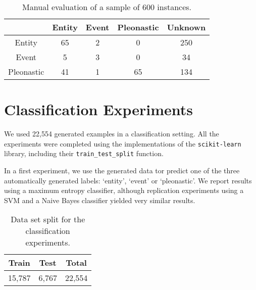 \documentclass[10pt, a4paper]{article} \usepackage{lrec} \usepackage{multibib}
\begin{document}
\begin{table}[h!]\centering 
\begin{tabular}{ccccc} 
\toprule 
&Entity & Event &Pleonastic & Unknown \\ 
\midrule Entity &   65  &  2   &   0     &  250  \\ 
Event &    5  &  3   &  0  &  34\\ 
Pleonastic& 41 & 1&  65&  134\\
\bottomrule 
\end{tabular} \caption{Manual evaluation of a sample of 600
instances.}\label{tab:manualsample600} 
\end{table}




%
%
%
%
\section{Classification Experiments}

We used 22,554 generated examples in a classification setting. All the experiments were completed using the implementations of the \texttt{scikit-learn} library, including their \texttt{train\_test\_split} function. 

In a first experiment, we use the generated data tor predict one of the three automatically generated labels: `entity', `event' or `pleonastic'. We report results using a maximum entropy classifier, although replication experiments using a SVM and a Naive Bayes classifier yielded very similar results. 


\begin{table}[h!]\centering
\begin{tabular}{ccc}
\toprule
\textbf{Train} & \textbf{Test} & \textbf{Total} \\
\midrule
15,787 & 6,767 & 22,554 \\
\bottomrule
\end{tabular}
\caption{Data set split for the classification experiments. }
\end{table}
\end{document}
